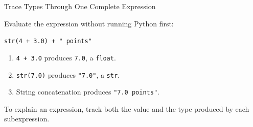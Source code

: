 \documentclass[aspectratio=169,10pt]{beamer}
\begin{document}
\begin{frame}{Trace Types Through One Complete Expression}

  \begin{activity}

    Evaluate the expression without running Python first:

    \begin{center}

      {\LARGE \texttt{str(4 + 3.0) + " points"}}

    \end{center}

  \end{activity}

  \begin{enumerate}

    \item \texttt{4 + 3.0} produces \texttt{7.0}, a \texttt{float}.

    \item \texttt{str(7.0)} produces \texttt{"7.0"}, a \texttt{str}.

    \item String concatenation produces \texttt{"7.0 points"}.

  \end{enumerate}

  \begin{keyidea}

    To explain an expression, track both the value and the type produced by each subexpression.

  \end{keyidea}

\end{frame}
\end{document}
